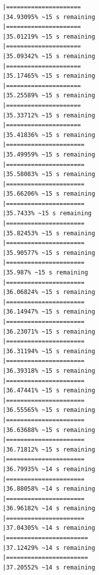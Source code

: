 \documentclass{article}\usepackage[]{graphicx}\usepackage[]{xcolor}
\makeatletter
\newenvironment{kframe}{%
 \def\at@end@of@kframe{}%
 \ifinner\ifhmode%
  \def\at@end@of@kframe{\end{minipage}}%
  \begin{minipage}{\columnwidth}%
 \fi\fi%
 \def\FrameCommand##1{\hskip\@totalleftmargin \hskip-\fboxsep
 \colorbox{shadecolor}{##1}\hskip-\fboxsep
     \hskip-\linewidth \hskip-\@totalleftmargin \hskip\columnwidth}%
 \MakeFramed {\advance\hsize-\width
   \@totalleftmargin\z@ \linewidth\hsize
   \@setminipage}}%
 {\par\unskip\endMakeFramed%
 \at@end@of@kframe}
\newenvironment{knitrout}{}{} %
\makeatother
\begin{document}
\begin{knitrout}
\begin{kframe}
\begin{verbatim}
|=====================                                         |34.93095% ~15 s remaining 
|=====================                                         |35.01219% ~15 s remaining 
|=====================                                         |35.09342% ~15 s remaining 
|=====================                                         |35.17465% ~15 s remaining 
|=====================                                         |35.25589% ~15 s remaining 
|=====================                                         |35.33712% ~15 s remaining 
|=====================                                         |35.41836% ~15 s remaining 
|======================                                        |35.49959% ~15 s remaining 
|======================                                        |35.58083% ~15 s remaining 
|======================                                        |35.66206% ~15 s remaining 
|======================                                        |35.7433% ~15 s remaining  
|======================                                        |35.82453% ~15 s remaining 
|======================                                        |35.90577% ~15 s remaining 
|======================                                        |35.987% ~15 s remaining   
|======================                                        |36.06824% ~15 s remaining 
|======================                                        |36.14947% ~15 s remaining 
|======================                                        |36.23071% ~15 s remaining 
|======================                                        |36.31194% ~15 s remaining 
|======================                                        |36.39318% ~15 s remaining 
|======================                                        |36.47441% ~15 s remaining 
|======================                                        |36.55565% ~15 s remaining 
|======================                                        |36.63688% ~15 s remaining 
|======================                                        |36.71812% ~15 s remaining 
|======================                                        |36.79935% ~14 s remaining 
|======================                                        |36.88058% ~14 s remaining 
|======================                                        |36.96182% ~14 s remaining 
|======================                                        |37.04305% ~14 s remaining 
|=======================                                       |37.12429% ~14 s remaining 
|=======================                                       |37.20552% ~14 s remaining 

\end{verbatim}
\end{kframe}
\end{knitrout}
\end{document}
